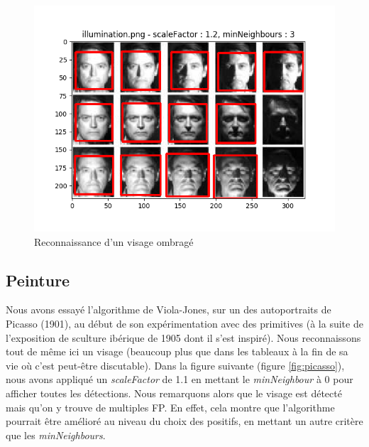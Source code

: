 \documentclass[a4paper,11pt]{article}
\begin{document}
	    \begin{figure}[H]
	        \begin{center}
		   \includegraphics[scale = 0.6]{images/illumination_1,2_3.png}
		   \caption{Reconnaissance d'un visage ombragé}
		   \label{fig:illumination}
	        \end{center}
	    \end{figure}

    \subsection{Peinture}

	Nous avons essayé l'algorithme de Viola-Jones, sur un des autoportraits de Picasso (1901), au
	début de son expérimentation avec des primitives (à la suite de l'exposition de sculture
	ibérique de 1905 dont il s'est inspiré). Nous reconnaissons tout de même ici un visage
	(beaucoup plus que dans les tableaux à la fin de sa vie où c'est peut-être discutable).
	Dans la figure suivante (figure \ref{fig:picasso}), nous avons appliqué un
	\textit{scaleFactor} de 1.1 en mettant le \textit{minNeighbour} à 0 pour afficher toutes les
	détections. Nous remarquons alors que le visage est détecté mais qu'on y trouve de multiples
	FP. En effet, cela montre que l'algorithme pourrait être amélioré au niveau du choix des
	positifs, en mettant un autre critère que les \textit{minNeighbours}.

\end{document}
